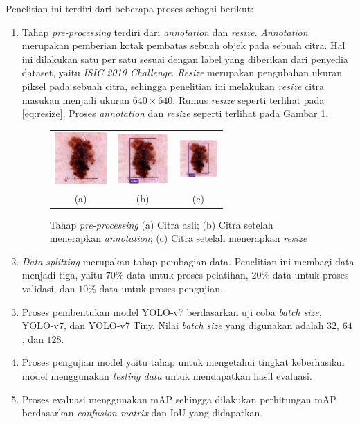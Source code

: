 Penelitian ini terdiri dari beberapa proses sebagai berikut:
\begin{enumerate}
    \item Tahap \textit{pre-processing} terdiri dari \textit{annotation} dan \textit{resize}. \textit{Annotation} merupakan pemberian kotak pembatas sebuah objek pada sebuah citra. Hal ini dilakukan satu per satu sesuai dengan label yang diberikan dari penyedia dataset, yaitu \textit{ISIC 2019 Challenge}. \textit{Resize} merupakan pengubahan ukuran piksel pada sebuah citra, sehingga penelitian ini melakukan \textit{resize} citra masukan menjadi ukuran $640\times 640$. Rumus \textit{resize} seperti terlihat pada \ref{eq:resize}. Proses \textit{annotation} dan \textit{resize} seperti terlihat pada Gambar \ref{fig:preprocessing}.
    \begin{figure}[H]
        \centering
        \begin{tabular}{ccc}
            \includegraphics[width=2cm]{../img/Dermoscopy - Latex.jpg}
            &
            \includegraphics[width=2cm]{../img/Annotation - Latex.png}
            &
            \includegraphics[width=1.5cm]{../img/Annotation - Latex.png}\\
            (a) &(b) &(c)\\
        \end{tabular}
        \caption{Tahap \textit{pre-processing} (a) Citra asli; (b) Citra setelah menerapkan \textit{annotation}; (c) Citra setelah menerapkan \textit{resize}}
        \label{fig:preprocessing}
    \end{figure}

    \item \textit{Data splitting} merupakan tahap pembagian data. Penelitian ini membagi data menjadi tiga, yaitu $70\%$ data untuk proses pelatihan, $20\%$ data untuk proses validasi, dan $10\%$ data untuk proses pengujian.
    \item Proses pembentukan model YOLO-v7 berdasarkan uji coba \textit{batch size}, YOLO-v7, dan YOLO-v7 Tiny. Nilai \textit{batch size} yang digunakan adalah $32$, $64$, dan $128$.
    \item Proses pengujian model yaitu tahap untuk mengetahui tingkat keberhasilan model menggunakan \textit{testing data} untuk mendapatkan hasil evaluasi.
    \item Proses evaluasi menggunakan mAP sehingga dilakukan perhitungan mAP berdasarkan \textit{confusion matrix} dan IoU yang didapatkan.
\end{enumerate}
